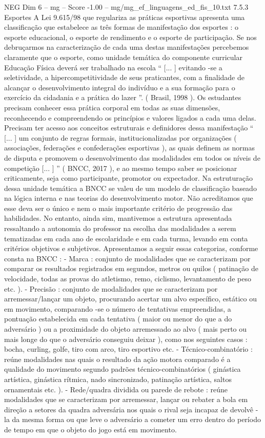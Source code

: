 \begin{textsample}{NEG Dim 6 – mg – Score -1.00 – mg/mg\_ef\_linguagens\_ed\_fis\_10.txt}  \label{ex:f6_neg_041}
7.5.3 Esportes A Lei 9.615/98 que regulariza as práticas esportivas apresenta uma classificação que estabelece as três formas de manifestação dos esportes : o esporte educacional, o esporte de rendimento e o esporte de participação.
Se nos debruçarmos na caracterização de cada uma destas manifestações percebemos claramente que o esporte, como unidade temática do componente curricular Educação Física deverá ser trabalhado na escola “ [... ] evitando -se a seletividade, a hipercompetitividade de seus praticantes, com a finalidade de alcançar o desenvolvimento integral do indivíduo e a sua formação para o exercício da cidadania e a prática do lazer ”. ( Brasil, 1998 ).
Os estudantes precisam conhecer essa prática corporal em todas as suas dimensões, reconhecendo e compreendendo os princípios e valores ligados a cada uma delas.
Precisam ter acesso aos conceitos estruturais e definidores dessa manifestação “ [... ] um conjunto de regras formais, institucionalizadas por organizações ( associações, federações e confederações esportivas ), as quais definem as normas de disputa e promovem o desenvolvimento das modalidades em todos os níveis de competição [... ] ” ( BNCC, 2017 ), e ao mesmo tempo saber se posicionar criticamente, seja como participante, promotor ou expectador.
Na estruturação dessa unidade temática a BNCC se valeu de um modelo de classificação baseado na lógica interna e nas teorias do desenvolvimento motor.
Não acreditamos que esse deva ser o único e nem o mais importante critério de progressão das habilidades.
No entanto, ainda sim, mantivemos a estrutura apresentada ressaltando a autonomia do professor na escolha das modalidades a serem tematizadas em cada ano de escolaridade e em cada turma, levando em conta critérios objetivos e subjetivos.
Apresentamos a seguir essas categorias, conforme consta na BNCC : - Marca : conjunto de modalidades que se caracterizam por comparar os resultados registrados em segundos, metros ou quilos ( patinação de velocidade, todas as provas do atletismo, remo, ciclismo, levantamento de peso etc. ). - Precisão : conjunto de modalidades que se caracterizam por arremessar/lançar um objeto, procurando acertar um alvo específico, estático ou em movimento, comparando -se o número de tentativas empreendidas, a pontuação estabelecida em cada tentativa ( maior ou menor do que a do adversário ) ou a proximidade do objeto arremessado ao alvo ( mais perto ou mais longe do que o adversário conseguiu deixar ), como nos seguintes casos : bocha, curling, golfe, tiro com arco, tiro esportivo etc. - Técnico-combinatório : reúne modalidades nas quais o resultado da ação motora comparado é a qualidade do movimento segundo padrões técnico-combinatórios ( ginástica artística, ginástica rítmica, nado sincronizado, patinação artística, saltos ornamentais etc. ). - Rede/quadra dividida ou parede de rebote : reúne modalidades que se caracterizam por arremessar, lançar ou rebater a bola em direção a setores da quadra adversária nos quais o rival seja incapaz de devolvê -la da mesma forma ou que leve o adversário a cometer um erro dentro do período de tempo em que o objeto do jogo está em movimento.

\end{textsample}
